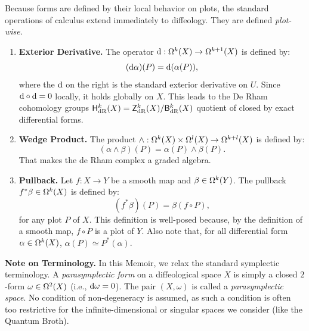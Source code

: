   \begin{article}
    Because forms are defined by their local behavior on plots,
    the standard operations of calculus extend immediately to diffeology.
    They are defined \emph{plot-wise}.
    
    \begin{enumerate}
      \item \textbf{Exterior Derivative.}
      The operator $\mathrm{d}: \Omega^k(X) \to \Omega^{k+1}(X)$ is defined by:
      \[
        (\mathrm{d}\alpha)(P) = \mathrm{d}(\alpha(P)),
        \]
      where the $\mathrm{d}$ on the right is the standard exterior derivative on $U$.
      Since $\mathrm{d} \circ \mathrm{d} = 0$ locally,
      it holds globally on $X$.
      This leads to the De Rham cohomology groups $\mathsf{H}_\mathrm{dR}^k(X) = \mathsf{Z}_\mathrm{dR}^k(X) / \mathsf{B}_\mathrm{dR}^k(X)$
      quotient of closed by exact differential forms.
      
      \item \textbf{Wedge Product.}
      The product $\wedge: \Omega^k(X) \times \Omega^l(X) \to \Omega^{k+l}(X)$ is defined by:
      \[
        (\alpha \wedge \beta)(P) = \alpha(P) \wedge \beta(P).
        \]
      That makes the de Rham complex a graded algebra.
      
      \item \textbf{Pullback.}
      Let $f: X \to Y$ be a smooth map and $\beta \in \Omega^k(Y)$.
      The pullback $f^*\beta \in \Omega^k(X)$ is defined by:
      \[
        (f^*\beta)(P) = \beta(f \circ P),
        \]
      for any plot $P$ of $X$.
      This definition is well-posed because,
      by the definition of a smooth map,
      $f \circ P$ is a plot of $Y$.
      Also note that,
      for all differential form $\alpha \in \Omega^k(X)$,
      $\alpha(P) \simeq P^*(\alpha)$.
    \end{enumerate}
    
    \textbf{Note on Terminology.}
    In this Memoir,
    we relax the standard symplectic terminology.
    A \emph{parasymplectic form} on a diffeological space $X$ is simply a closed $2$-form $\omega \in \Omega^2(X)$ (i.e., $\mathrm{d}\omega = 0$).
    The pair $(X, \omega)$ is called a \emph{parasymplectic space}.
    No condition of non-degeneracy is assumed,
    as such a condition is often too restrictive for the infinite-dimensional or singular spaces we consider (like the Quantum Broth).
  \end{article}
  
